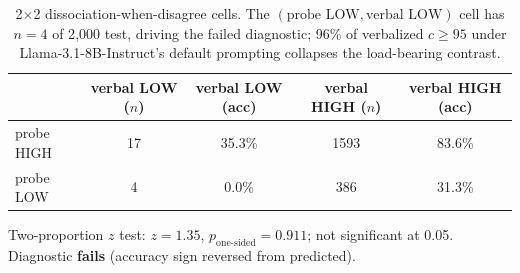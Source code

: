 \begin{table}[t]
\centering
\caption{2$\times$2 dissociation-when-disagree cells. The $(\text{probe LOW}, \text{verbal LOW})$ cell has $n=4$ of 2{,}000 test, driving the failed diagnostic; 96\% of verbalized $c \ge 95$ under Llama-3.1-8B-Instruct's default prompting collapses the load-bearing contrast.}
\label{tab:c3c_dissociation}
\begin{tabular}{lcccc}
\toprule
 & verbal LOW ($n$) & verbal LOW (acc) & verbal HIGH ($n$) & verbal HIGH (acc) \\
\midrule
probe HIGH & 17 & 35.3\% & 1593 & 83.6\% \\
probe LOW & 4 & 0.0\% & 386 & 31.3\% \\
\bottomrule
\end{tabular}
\vspace{0.5em}
\noindent\footnotesize Two-proportion $z$ test: $z = 1.35$, $p_{\text{one-sided}} = 0.911$; not significant at 0.05. Diagnostic \textbf{fails} (accuracy sign reversed from predicted).
\end{table}
